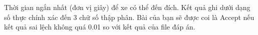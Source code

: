Thời gian ngắn nhất (đơn vị giây) để xe có thể đến đích. Kết quả ghi dưới dạng số thực chính xác đến 3 chữ số thập phân. Bài của bạn sẽ được coi là Accept nếu kết quả sai lệch không quá 0.01 so với kết quả của file đáp án.